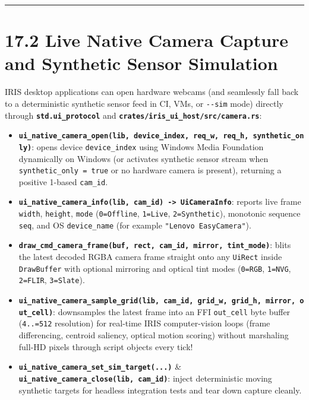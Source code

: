 \documentclass[
  english,
  oneside]{book}
\providecommand{\tightlist}{%
  \setlength{\itemsep}{0pt}\setlength{\parskip}{0pt}}
\begin{document}
\begin{center}\rule{0.5\linewidth}{0.5pt}\end{center}

\section{17.2 Live Native Camera Capture and Synthetic Sensor
Simulation}\label{live-native-camera-capture-and-synthetic-sensor-simulation}

IRIS desktop applications can open hardware webcams (and seamlessly fall
back to a deterministic synthetic sensor feed in CI, VMs, or
\texttt{-\/-sim} mode) directly through
\textbf{\texttt{std.ui\_protocol}} and
\textbf{\texttt{crates/iris\_ui\_host/src/camera.rs}}:

\begin{itemize}
\tightlist
\item
  \textbf{\texttt{ui\_native\_camera\_open(lib,\ device\_index,\ req\_w,\ req\_h,\ synthetic\_only)}}:
  opens device \texttt{device\_index} using Windows Media Foundation
  dynamically on Windows (or activates synthetic sensor stream when
  \texttt{synthetic\_only\ =\ true} or no hardware camera is present),
  returning a positive 1-based \texttt{cam\_id}.
\item
  \textbf{\texttt{ui\_native\_camera\_info(lib,\ cam\_id)\ -\textgreater{}\ UiCameraInfo}}:
  reports live frame \texttt{width}, \texttt{height}, \texttt{mode}
  (\texttt{0=Offline}, \texttt{1=Live}, \texttt{2=Synthetic}), monotonic
  sequence \texttt{seq}, and OS \texttt{device\_name} (for example
  \texttt{"Lenovo\ EasyCamera"}).
\item
  \textbf{\texttt{draw\_cmd\_camera\_frame(buf,\ rect,\ cam\_id,\ mirror,\ tint\_mode)}}:
  blits the latest decoded RGBA camera frame straight onto any
  \texttt{UiRect} inside \texttt{DrawBuffer} with optional mirroring and
  optical tint modes (\texttt{0=RGB}, \texttt{1=NVG}, \texttt{2=FLIR},
  \texttt{3=Slate}).
\item
  \textbf{\texttt{ui\_native\_camera\_sample\_grid(lib,\ cam\_id,\ grid\_w,\ grid\_h,\ mirror,\ out\_cell)}}:
  downsamples the latest frame into an FFI \texttt{out\_cell} byte
  buffer (\texttt{4..=512} resolution) for real-time IRIS
  computer-vision loops (frame differencing, centroid saliency, optical
  motion scoring) without marshaling full-HD pixels through script
  objects every tick!
\item
  \textbf{\texttt{ui\_native\_camera\_set\_sim\_target(...)}} \&
  \textbf{\texttt{ui\_native\_camera\_close(lib,\ cam\_id)}}: inject
  deterministic moving synthetic targets for headless integration tests
  and tear down capture cleanly.
\end{itemize}
\end{document}
